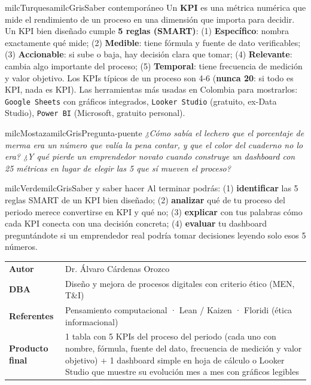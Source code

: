 \documentclass[11pt,letterpaper]{article}
\begin{document}
\begin{softbox}{milcTurquesa}{milcGris}{Saber contemporáneo}
Un \textbf{KPI} es una métrica numérica que mide el rendimiento de un proceso en una dimensión que importa para decidir. Un KPI bien diseñado cumple \textbf{5 reglas (SMART)}: (1) \textbf{Específico}: nombra exactamente qué mide; (2) \textbf{Medible}: tiene fórmula y fuente de dato verificables; (3) \textbf{Accionable}: si sube o baja, hay decisión clara que tomar; (4) \textbf{Relevante}: cambia algo importante del proceso; (5) \textbf{Temporal}: tiene frecuencia de medición y valor objetivo. Los KPIs típicos de un proceso son 4-6 (\textbf{nunca 20}: si todo es KPI, nada es KPI). Las herramientas más usadas en Colombia para mostrarlos: \texttt{Google Sheets} con gráficos integrados, \texttt{Looker Studio} (gratuito, ex-Data Studio), \texttt{Power BI} (Microsoft, gratuito personal).
\end{softbox}

\begin{softbox}{milcMostaza}{milcGris}{Pregunta-puente}
\textit{¿Cómo sabía el lechero que el porcentaje de merma era un número que valía la pena contar, y que el color del cuaderno no lo era? ¿Y qué pierde un emprendedor novato cuando construye un dashboard con 25 métricas en lugar de elegir las 5 que sí mueven el proceso?}
\end{softbox}

\begin{softbox}{milcVerde}{milcGris}{Saber y saber hacer}
Al terminar podrás: (1) \textbf{identificar} las 5 reglas SMART de un KPI bien diseñado; (2) \textbf{analizar} qué de tu proceso del periodo merece convertirse en KPI y qué no; (3) \textbf{explicar} con tus palabras cómo cada KPI conecta con una decisión concreta; (4) \textbf{evaluar} tu dashboard preguntándote si un emprendedor real podría tomar decisiones leyendo solo esos 5 números.
\end{softbox}



\small
\begin{tabularx}{\textwidth}{>{\bfseries}p{3.0cm}Y}
Autor & Dr. Álvaro Cárdenas Orozco\\
DBA & Diseño y mejora de procesos digitales con criterio ético (MEN, T\&I)\\
Referentes & Pensamiento computacional · Lean / Kaizen · Floridi (ética informacional)\\
Producto final & 1 tabla con 5 KPIs del proceso del periodo (cada uno con nombre, fórmula, fuente del dato, frecuencia de medición y valor objetivo) + 1 dashboard simple en hoja de cálculo o Looker Studio que muestre su evolución mes a mes con gráficos legibles\\
\end{tabularx}
\normalsize
\end{document}
